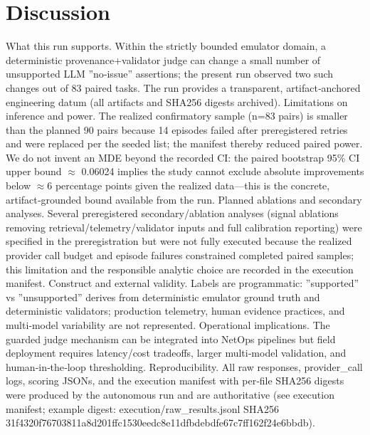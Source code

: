 \documentclass[conference]{IEEEtran}
\begin{document}
\section{Discussion}
What this run supports. Within the strictly bounded emulator domain, a deterministic provenance+validator judge can change a small number of unsupported LLM ''no‑issue'' assertions; the present run observed two such changes out of 83 paired tasks. The run provides a transparent, artifact‑anchored engineering datum (all artifacts and SHA256 digests archived). Limitations on inference and power. The realized confirmatory sample (n=83 pairs) is smaller than the planned 90 pairs because 14 episodes failed after preregistered retries and were replaced per the seeded list; the manifest thereby reduced paired power. We do not invent an MDE beyond the recorded CI: the paired bootstrap 95\% CI upper bound \ensuremath{\approx} 0.06024 implies the study cannot exclude absolute improvements below \ensuremath{\approx}6 percentage points given the realized data---this is the concrete, artifact‑grounded bound available from the run. Planned ablations and secondary analyses. Several preregistered secondary/ablation analyses (signal ablations removing retrieval/telemetry/validator inputs and full calibration reporting) were specified in the preregistration but were not fully executed because the realized provider call budget and episode failures constrained completed paired samples; this limitation and the responsible analytic choice are recorded in the execution manifest. Construct and external validity. Labels are programmatic: ''supported'' vs ''unsupported'' derives from deterministic emulator ground truth and deterministic validators; production telemetry, human evidence practices, and multi‑model variability are not represented. Operational implications. The guarded judge mechanism can be integrated into NetOps pipelines but field deployment requires latency/cost tradeoffs, larger multi‑model validation, and human‑in‑the‑loop thresholding. Reproducibility. All raw responses, provider\_call logs, scoring JSONs, and the execution manifest with per‑file SHA256 digests were produced by the autonomous run and are authoritative (see execution manifest; example digest: execution/raw\_results.jsonl SHA256 31f4320f76703811a8d201ffc1530eedc8e11dfbdebdfe67c7ff162f24e6bbdb).
\end{document}
